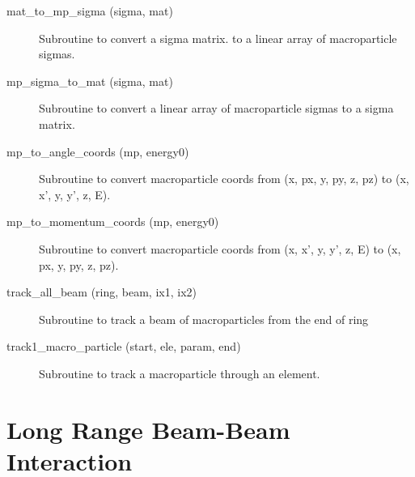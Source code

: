 \begin{description}

\item[mat\_to\_mp\_sigma (sigma, mat)] \Newline 
     Subroutine to convert a sigma matrix. to a linear array of 
     macroparticle sigmas.

\item[mp\_sigma\_to\_mat (sigma, mat)] \Newline 
     Subroutine to convert a linear array of macroparticle sigmas to a 
     sigma matrix. 

\item[mp\_to\_angle\_coords (mp, energy0)] \Newline 
Subroutine to convert macroparticle coords from 
(x, px, y, py, z, pz) to (x, x', y, y', z, E).

\item[mp\_to\_momentum\_coords (mp, energy0)] \Newline 
Subroutine to convert macroparticle coords from 
(x, x', y, y', z, E) to (x, px, y, py, z, pz).

\item[track\_all\_beam (ring, beam, ix1, ix2)] \Newline 
Subroutine to track a beam of macroparticles from the end of
ring%

\item[track1\_macro\_particle (start, ele, param, end)] \Newline 
     Subroutine to track a macroparticle through an element.

\end{description}

\section{Long Range Beam-Beam Interaction}
\label{r:lrbbi}    


